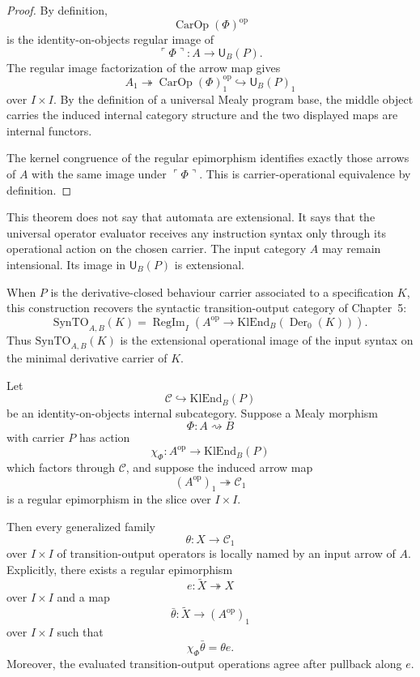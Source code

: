 \begin{proof}
By definition,
\[
        \operatorname{CarOp}(\Phi)^{\operatorname{op}}
\]
is the identity-on-objects regular image of
\[
        \ulcorner\Phi\urcorner:A\to\mathsf U_B(P).
\]
The regular image factorization of the arrow map gives
\[
        A_1
        \twoheadrightarrow
        \operatorname{CarOp}(\Phi)^{\operatorname{op}}_1
        \hookrightarrow
        \mathsf U_B(P)_1
\]
over \(I\times I\).  By the definition of a universal Mealy program base, the middle object
carries the induced internal category structure and the two displayed maps are internal functors.

The kernel congruence of the regular epimorphism identifies exactly those arrows of \(A\) with the
same image under \(\ulcorner\Phi\urcorner\).  This is carrier-operational equivalence by
definition.
\end{proof}

This theorem does not say that automata are extensional.  It says that the universal operator
evaluator receives any instruction syntax only through its operational action on the chosen carrier.
The input category \(A\) may remain intensional.  Its image in \(\mathsf U_B(P)\) is extensional.

When \(P\) is the derivative-closed behaviour carrier associated to a specification \(K\), this
construction recovers the syntactic transition-output category of Chapter~5:
\[
        \mathrm{SynTO}_{A,B}(K)
        =
        \operatorname{RegIm}_I\left(
            A^{\operatorname{op}}
            \longrightarrow
            \mathrm{KlEnd}_B(\operatorname{Der}_0(K))
        \right).
\]
Thus \(\mathrm{SynTO}_{A,B}(K)\) is the extensional operational image of the input syntax on the
minimal derivative carrier of \(K\).

\begin{proposition}
\label{prop:local-coding-operational-density}
Let
\[
        \mathcal C\hookrightarrow \mathrm{KlEnd}_B(P)
\]
be an identity-on-objects internal subcategory.  Suppose a Mealy morphism
\[
        \Phi:A\rightsquigarrow B
\]
with carrier \(P\) has action
\[
        \chi_\Phi:A^{\operatorname{op}}\to\mathrm{KlEnd}_B(P)
\]
which factors through \(\mathcal C\), and suppose the induced arrow map
\[
        (A^{\operatorname{op}})_1\twoheadrightarrow \mathcal C_1
\]
is a regular epimorphism in the slice over \(I\times I\).

Then every generalized family
\[
        \theta:X\to\mathcal C_1
\]
over \(I\times I\) of transition-output operators is locally named by an input arrow of \(A\).
Explicitly, there exists a regular epimorphism
\[
        e:\widetilde X\twoheadrightarrow X
\]
over \(I\times I\) and a map
\[
        \bar\theta:\widetilde X\to (A^{\operatorname{op}})_1
\]
over \(I\times I\) such that
\[
        \chi_\Phi\bar\theta=\theta e.
\]
Moreover, the evaluated transition-output operations agree after pullback along \(e\).
\end{proposition}

